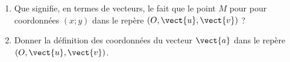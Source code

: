 
\begin{exercice}\label{exosmath-0057}

    \begin{enumerate}
        \item
            Que signifie, en termes de vecteurs, le fait que le point \( M\) pour pour coordonnées \( (x;y)\) dans le repère \( (O,\vect{ u },\vect{ v })\) ?
        \item
            Donner la définition des coordonnées du vecteur \( \vect{ a }\) dans le repère \( (O,\vect{ u },\vect{ v })\).
    \end{enumerate}

\end{exercice}
